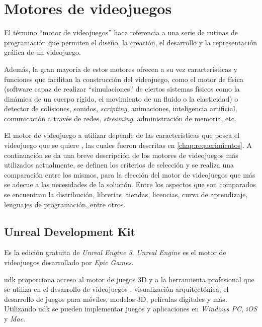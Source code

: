 \section{Motores de videojuegos}


El término \enquote{motor de videojuegos} hace referencia a una serie de rutinas
de programación que permiten el diseño, la creación, el desarrollo y la
representación gráfica de un videojuego\cite{videojuego:telechea}.

Además, la gran mayoría de estos motores ofrecen a su vez características y
funciones que facilitan la construcción del videojuego, como el motor de física
(software capaz de realizar \enquote{simulaciones} de ciertos sistemas físicos
como la dinámica de un cuerpo rígido, el movimiento de un fluido o la
elasticidad) o detector de colisiones, sonidos, \textit{scripting}, animaciones,
inteligencia artificial, comunicación a través de redes, \textit{streaming},
administración de memoria, etc\cite{videojuego:telechea}.

El motor de videojuego a utilizar depende de las características que posea el
videojuego que se quiere , las cuales
fueron descritas en \ref{chap:requerimientos}. A continuación se da una breve
descripción de los motores de videojuegos más utilizados actualmente, se definen
los criterios de selección y se realiza una comparación entre los mismos, para
la elección del motor de videojuegos que más se adecue a las necesidades de la
solución. Entre los aspectos que son comparados se encuentran la distribución,
librerías, tiendas, licencias, curva de aprendizaje, lenguajes de programación,
entre otros.

\subsection{Unreal Development Kit}

Es la edición gratuita de \textit{Unreal Engine 3}. \textit{Unreal Engine} es el
motor de videojuegos desarrollado por \textit{Epic Games}\cite{unrealengine}.

\Gls{udk} proporciona acceso al motor de juegos 3D y a la herramienta
profesional que se utiliza en el desarrollo de videojuegos
, visualización arquitectónica, el desarrollo de juegos
para móviles, modelos 3D, películas digitales y más. Utilizando \Gls{udk} se
pueden implementar juegos y aplicaciones en \textit{Windows PC}, \textit{iOS} y
\textit{Mac}\cite{unrealengine}.

